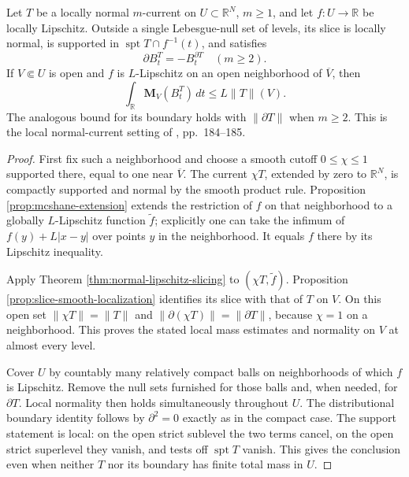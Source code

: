 \begin{theorem}\label{thm:local-normal-current-slicing}
Let $T$ be a locally normal $m$-current on $U\subset\mathbb R^N$, $m\geq1$, and let $f:U\to\mathbb R$ be locally Lipschitz. Outside a single Lebesgue-null set of levels, its slice is locally normal, is supported in $\operatorname{spt}T\cap f^{-1}(t)$, and satisfies
\[
 \partial B_t^T=-B_t^{\partial T}\quad(m\geq2).
\]
If $V\Subset U$ is open and $f$ is $L$-Lipschitz on an open neighborhood of $\overline V$, then
\[
 \int_{\mathbb R}\mathbf M_V(B_t^T)\,dt\leq L\|T\|(V).
\]
The analogous bound for its boundary holds with $\|\partial T\|$ when $m\geq2$. This is the local normal-current setting of \cite{Sim18}, pp.~184--185.
\end{theorem}
\begin{proof}
First fix such a neighborhood and choose a smooth cutoff $0\leq\chi\leq1$ supported there, equal to one near $\overline V$. The current $\chi T$, extended by zero to $\mathbb R^N$, is compactly supported and normal by the smooth product rule. Proposition \ref{prop:mcshane-extension} extends the restriction of $f$ on that neighborhood to a globally $L$-Lipschitz function $\widetilde f$; explicitly one can take the infimum of $f(y)+L|x-y|$ over points $y$ in the neighborhood. It equals $f$ there by its Lipschitz inequality.

Apply Theorem \ref{thm:normal-lipschitz-slicing} to $(\chi T,\widetilde f)$. Proposition \ref{prop:slice-smooth-localization} identifies its slice with that of $T$ on $V$. On this open set $\|\chi T\|=\|T\|$ and $\|\partial(\chi T)\|=\|\partial T\|$, because $\chi=1$ on a neighborhood. This proves the stated local mass estimates and normality on $V$ at almost every level.

Cover $U$ by countably many relatively compact balls on neighborhoods of which $f$ is Lipschitz. Remove the null sets furnished for those balls and, when needed, for $\partial T$. Local normality then holds simultaneously throughout $U$. The distributional boundary identity follows by $\partial^2=0$ exactly as in the compact case. The support statement is local: on the open strict sublevel the two terms cancel, on the open strict superlevel they vanish, and tests off $\operatorname{spt}T$ vanish. This gives the conclusion even when neither $T$ nor its boundary has finite total mass in $U$.
\end{proof}
